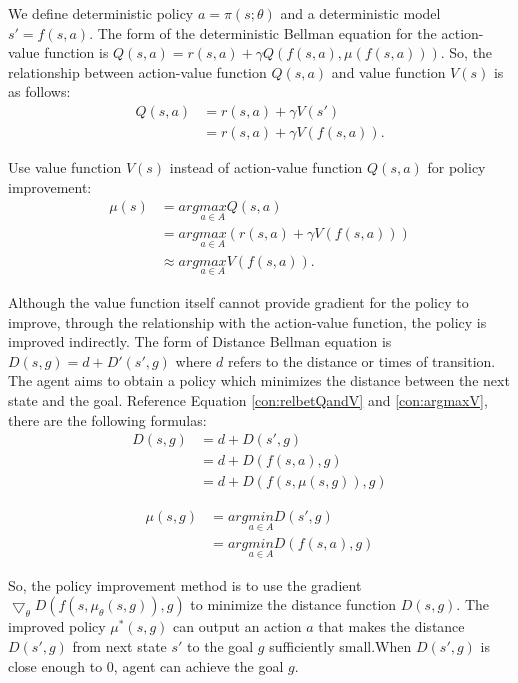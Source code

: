 \documentclass[8pt,twoside,a4paper]{article}
\begin{document}
\par We define deterministic policy $a=\pi(s;\theta)$ and a deterministic model $s'=f(s,a)$. The form of the deterministic Bellman equation for the action-value function is $Q(s,a)=r(s,a)+\gamma Q(f(s,a),\mu(f(s,a)))$. So, the relationship between action-value function $Q(s,a)$ and value function $V(s)$ is as follows:
\begin{equation}
\begin{aligned}
Q(s,a)&=r(s,a)+\gamma V(s')\\
&=r(s,a)+\gamma V(f(s,a)).	\label{con:relbetQandV}
\end{aligned}
\end{equation}
\par Use value function $V(s)$ instead of action-value function $Q(s,a)$ for policy improvement:
\begin{equation}
\begin{aligned}
\mu(s) &= arg\underset{a \in A}{max} Q(s,a)\\
&= arg\underset{a \in A}{max} (r(s,a)+\gamma V(f(s,a)))\\
&\approx arg\underset{a \in A}{max} V(f(s,a)). \label{con:argmaxV}
\end{aligned}
\end{equation}
\par Although the value function itself cannot provide gradient for the policy to improve, through the relationship with the action-value function, the policy is improved indirectly. The form of Distance Bellman equation is $D(s,g)=d+{D}'(s',g)$ where $d$ refers to the distance or times of transition. The agent aims to obtain a policy which minimizes the distance between the next state and the goal. Reference Equation \ref{con:relbetQandV} and \ref{con:argmaxV}, there are the following formulas:
\begin{equation}
\begin{aligned}
D(s,g)&=d+{D}(s',g)\\
&=d+{D}(f(s,a),g)\\
&=d+{D}(f(s,\mu(s,g)),g)
\end{aligned}
\end{equation}

\begin{equation}
\begin{aligned}
\mu(s,g)&= arg\underset{a \in A}{min} {D}(s',g)\\
&= arg\underset{a \in A}{min} {D}(f(s,a),g)
\end{aligned}
\end{equation}
\par So, the policy improvement method is to use the gradient $\bigtriangledown_{\theta } D(f(s,\mu_{\theta}(s,g)),g)$ to minimize the distance function $D(s,g)$. The improved policy $\mu^{*}(s,g)$ can output an action $a$ that makes the distance $D(s',g)$ from next state $s'$ to the goal $g$ sufficiently small.When $D(s',g)$ is close enough to 0, agent can achieve the goal $g$.
\end{document}
